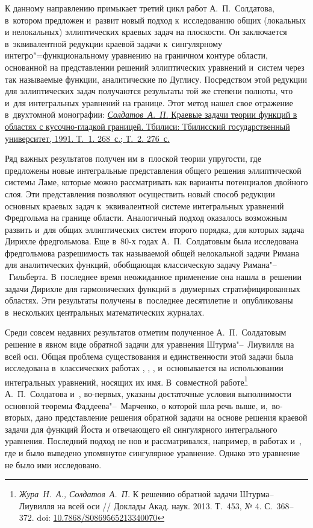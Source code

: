 К данному   направлению   примыкает третий цикл работ А.~П.~Солдатова, в~котором предложен и~развит новый подход к~исследованию общих (локальных и нелокальных) эллиптических краевых задач на плоскости. 
Он заключается в~эквивалентной редукции краевой задачи к~сингулярному интегро"=функциональному уравнению на граничном контуре области, основанной на представлении решений эллиптических уравнений и~систем через так называемые функции, аналитические по Дуглису. 
Посредством этой редукции для эллиптических задач получаются результаты той же степени полноты, что и~для интегральных уравнений на границе. 
Этот метод нашел свое отражение в~двухтомной монографии:
\href{https://zbmath.org/?q=an:0854.30029}{{\it Солдатов~А.~П.} Краевые задачи теории функций в областях с кусочно-гладкой границей. Тбилиси: Тбилисский государственный университет, 1991. Т.~1. 268~с.; Т.~2. 276~с.}


Ряд важных результатов получен им в~плоской теории упругости, где предложены новые интегральные представления общего решения эллиптической системы Ламе, которые можно рассматривать как варианты потенциалов двойного слоя. 
Эти представления позволяют осуществить новый способ редукции основных краевых задач к~эквивалентной системе интегральных уравнений Фредгольма на границе области. 
Аналогичный подход оказалось возможным развить и~для общих эллиптических систем второго порядка, для которых задача Дирихле фредгольмова. 
Еще в~80-х годах А.~П.~Солдатовым была исследована фредгольмова разрешимость так называемой общей нелокальной задачи Римана для аналитических функций, обобщающая классическую задачу Римана"--~Гильберта. 
В~последнее время неожиданное применение она нашла в~решении задачи Дирихле для гармонических функций в~двумерных стратифицированных областях. 
Эти результаты получены в~последнее десятилетие и~опубликованы в~нескольких центральных математических журналах. 

Среди совсем недавних результатов отметим полученное А.~П.~Солдатовым решение в явном виде обратной задачи для уравнения Штурма"--~Лиувилля на всей оси. 
Общая проблема существования и единственности этой задачи была исследована в~классических работах 
, 
, 
, 
 и~основывается на использовании интегральных уравнений, носящих их имя. 
В~совместной 
работе\footnote{{\textit{Жура~Н.~А., Солдатов~А.~П.} К решению обратной задачи Штурма--Лиувилля на всей оси /\!/ Доклады Акад. наук. 2013. Т.~453, № 4. С.~368--372.} doi: \href{http://dx.doi.org/10.7868/S0869565213340070}{10.7868/S0869565213340070}}\! А.~П.~Солдатова и~, во-первых, указаны достаточные условия выполнимости основной теоремы Фаддеева"--~Марченко, о которой шла речь выше, и,~во-вторых, дано представление решения обратной задачи на основе решения краевой задачи для функций Йоста и отвечающего ей сингулярного интегрального уравнения. Последний подход не нов и рассматривался, например, в работах 
 и~, где и было выведено упомянутое сингулярное уравнение. 
Однако это уравнение не было ими исследовано. 

